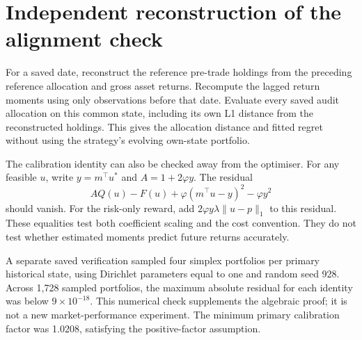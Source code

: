 \documentclass[sigconf,anonymous,review]{acmart}
\begin{document}
\section{Independent reconstruction of the alignment check}\label{app:verification}
For a saved date, reconstruct the reference pre-trade holdings from the preceding reference allocation and gross asset returns. Recompute the lagged return moments using only observations before that date. Evaluate every saved audit allocation on this common state, including its own L1 distance from the reconstructed holdings. This gives the allocation distance and fitted regret without using the strategy's evolving own-state portfolio.

The calibration identity can also be checked away from the optimiser. For any feasible $u$, write $y=m^\top u^*$ and $A=1+2\varphi y$. The residual
\begin{equation}
 A Q(u)-F(u)+\varphi(m^\top u-y)^2-\varphi y^2
\end{equation}
should vanish. For the risk-only reward, add $2\varphi y\lambda\|u-p\|_1$ to this residual. These equalities test both coefficient scaling and the cost convention. They do not test whether estimated moments predict future returns accurately.

A separate saved verification sampled four simplex portfolios per primary historical state, using Dirichlet parameters equal to one and random seed 928. Across 1,728 sampled portfolios, the maximum absolute residual for each identity was below $9\times10^{-18}$. This numerical check supplements the algebraic proof; it is not a new market-performance experiment. The minimum primary calibration factor was 1.0208, satisfying the positive-factor assumption.
\end{document}
